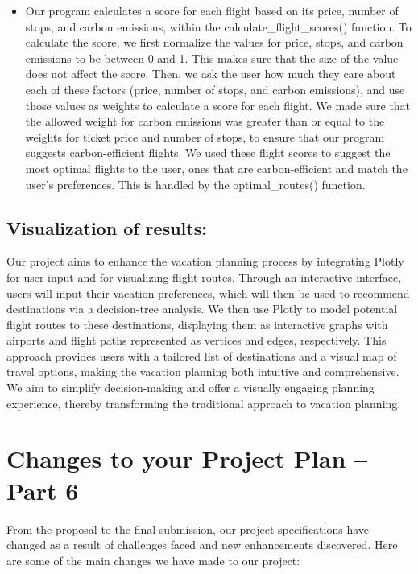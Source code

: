 \documentclass[11pt]{article}
\begin{document}
\begin{itemize}
    \item Our program calculates a score for each flight based on its price, number of stops, and carbon emissions, within the calculate\_flight\_scores() function. To calculate the score, we first normalize the values for price, stops, and carbon emissions to be between 0 and 1. This makes sure that the size of the value does not affect the score. Then, we ask the user how much they care about each of these factors (price, number of stops, and carbon emissions), and use those values as weights to calculate a score for each flight. We made sure that the allowed weight for carbon emissions was greater than or equal to the weights for ticket price and number of stops, to ensure that our program suggests carbon-efficient flights. We used these flight scores to suggest the most optimal flights to the user, ones that are carbon-efficient and match the user’s preferences. This is handled by the optimal\_routes() function.
\end{itemize}

\subsection*{Visualization of results:}

\noindent Our project aims to enhance the vacation planning process by integrating Plotly for user input and for visualizing flight routes. Through an interactive interface, users will input their vacation preferences, which will then be used to recommend destinations via a decision-tree analysis. We then use Plotly to model potential flight routes to these destinations, displaying them as interactive graphs with airports and flight paths represented as vertices and edges, respectively. This approach provides users with a tailored list of destinations and a visual map of travel options, making the vacation planning both intuitive and comprehensive. We aim to simplify decision-making and offer a visually engaging planning experience, thereby transforming the traditional approach to vacation planning.

\section*{Changes to your Project Plan -- Part 6}

\noindent From the proposal to the final submission, our project specifications have changed as a result of challenges faced and new enhancements discovered. Here are some of the main changes we have made to our project:
\end{document}
